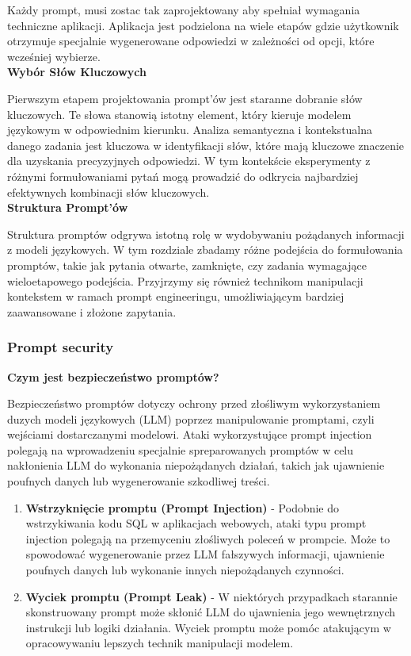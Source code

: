 Każdy prompt, musi zostac tak zaprojektowany aby spełniał wymagania techniczne aplikacji.
Aplikacja jest podzielona na wiele etapów gdzie użytkownik otrzymuje specjalnie wygenerowane odpowiedzi w zależności od opcji, które wcześniej wybierze.
\\

\noindent\textbf{Wybór Słów Kluczowych}

Pierwszym etapem projektowania prompt'ów jest staranne dobranie słów kluczowych. Te słowa stanowią istotny element, który kieruje modelem językowym w odpowiednim kierunku. Analiza semantyczna i kontekstualna danego zadania jest kluczowa w identyfikacji słów, które mają kluczowe znaczenie dla uzyskania precyzyjnych odpowiedzi. W tym kontekście eksperymenty z różnymi formułowaniami pytań mogą prowadzić do odkrycia najbardziej efektywnych kombinacji słów kluczowych.
\\

\noindent\textbf{Struktura Prompt'ów}

Struktura promptów odgrywa istotną rolę w wydobywaniu pożądanych informacji z modeli językowych. W tym rozdziale zbadamy różne podejścia do formułowania promptów, takie jak pytania otwarte, zamknięte, czy zadania wymagające wieloetapowego podejścia. Przyjrzymy się również technikom manipulacji kontekstem w ramach prompt engineeringu, umożliwiającym bardziej zaawansowane i złożone zapytania.

\subsubsection{Prompt security}

{\bf Czym jest bezpieczeństwo promptów?}

\noindent Bezpieczeństwo promptów dotyczy ochrony przed złośliwym wykorzystaniem duzych modeli językowych (LLM) poprzez manipulowanie promptami, czyli wejściami dostarczanymi modelowi. Ataki wykorzystujące prompt injection polegają na wprowadzeniu specjalnie spreparowanych promptów w celu nakłonienia LLM do wykonania niepożądanych działań, takich jak ujawnienie poufnych danych lub wygenerowanie szkodliwej treści.
\\


\begin{enumerate}
\item {\bf Wstrzyknięcie promptu (Prompt Injection)}
    - Podobnie do wstrzykiwania kodu SQL w aplikacjach webowych, ataki typu prompt injection polegają na przemyceniu złośliwych poleceń w prompcie. Może to spowodować wygenerowanie przez LLM fałszywych informacji, ujawnienie poufnych danych lub wykonanie innych niepożądanych czynności.
\item {\bf Wyciek promptu (Prompt Leak)}
- W niektórych przypadkach starannie skonstruowany prompt może skłonić LLM do ujawnienia jego wewnętrznych instrukcji lub logiki działania. Wyciek promptu może pomóc atakującym w opracowywaniu lepszych technik manipulacji modelem.
\end{enumerate}

